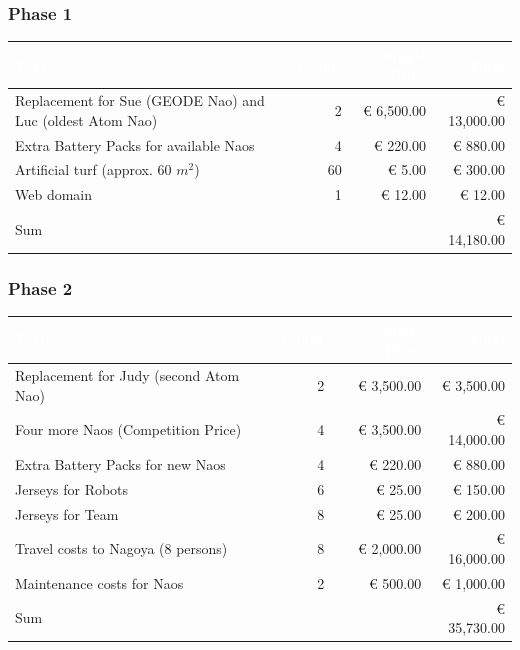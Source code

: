 \documentclass[12pt]{article}
\theoremstyle{definition}
\begin{document}
\subsubsection{Phase 1}
\begin{tabular}{|p{.51\linewidth}|r|r|r|}
\hline
\cellcolor[gray]{0.5}\textcolor{white}{Text} & \cellcolor[gray]{0.45}\textcolor{white}{Count} & \cellcolor[gray]{0.5}\textcolor{white}{Single Price} & \cellcolor[gray]{0.45}\textcolor{white}{Total} \\ \hline
Replacement for Sue (GEODE Nao) and Luc (oldest Atom Nao) & 2 & \euro{} 6,500.00 & \euro{} 13,000.00\\ \hline
Extra Battery Packs for available Naos & 4 & \euro{} 220.00 & \euro{} 880.00 \\ \hline
Artificial turf (approx. 60 $m^2$) & 60 & \euro{} 5.00 & \euro{} 300.00 \\ \hline
Web domain & 1 & \euro{} 12.00 & \euro{} 12.00 \\ \hline
Sum &  &  & \euro{} 14,180.00 \\ \hline
\end{tabular}

\subsubsection{Phase 2}
\begin{tabular}{|p{.51\linewidth}|r|r|r|}
\hline
\cellcolor[gray]{0.5}\textcolor{white}{Text} & \cellcolor[gray]{0.45}\textcolor{white}{Count} & \cellcolor[gray]{0.5}\textcolor{white}{Single Price} & \cellcolor[gray]{0.45}\textcolor{white}{Total} \\ \hline
Replacement for Judy (second Atom Nao) & 2 & \euro{} 3,500.00 & \euro{} 3,500.00\\ \hline
Four more Naos (Competition Price) & 4 & \euro{} 3,500.00 & \euro{} 14,000.00 \\ \hline
Extra Battery Packs for new Naos & 4 & \euro{} 220.00 & \euro{} 880.00 \\ \hline
Jerseys for Robots & 6 & \euro{} 25.00 & \euro{} 150.00 \\ \hline
Jerseys for Team & 8 & \euro{} 25.00 & \euro{} 200.00 \\ \hline
Travel costs to Nagoya (8 persons) & 8 & \euro{} 2,000.00 & \euro{} 16,000.00 \\ \hline
Maintenance costs for Naos & 2 & \euro{} 500.00 & \euro{} 1,000.00 \\ \hline
Sum &  &  & \euro{} 35,730.00 \\ \hline
\end{tabular}

{}
\end{document}

